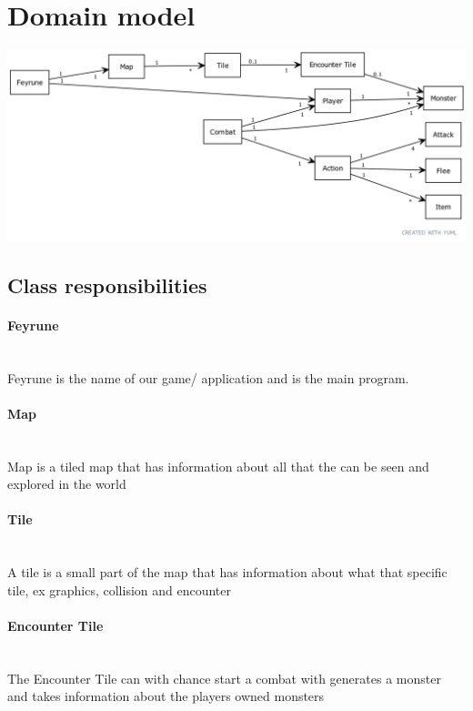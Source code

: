 \section{Domain model}

\includegraphics[width=\textwidth]{images/domain_model.png}

\subsection{Class responsibilities}

    \paragraph{Feyrune}
    ~\\\indent\indent Feyrune is the name of our game/ application and is the main program.
    \paragraph{Map}
    ~\\\indent\indent Map is a tiled map that has information about all that the can be seen and explored in the world
    \paragraph{Tile}
    ~\\\indent\indent A tile is a small part of the map that has information about what that specific tile, ex graphics, collision and encounter
    \paragraph{Encounter Tile}
    ~\\\indent\indent The Encounter Tile can with chance start a combat with generates a monster and takes information about the players owned monsters
